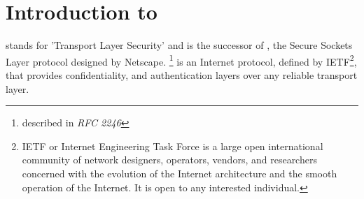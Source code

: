\chapter{Introduction to \tls{}}

\label{sec:tlsintro}
\tls{} stands for 'Transport Layer Security' and is the successor of \ssl{}, 
the Secure Sockets Layer protocol designed by Netscape. 
\tlsI{}\footnote{described in {\it RFC 2246}} is an Internet protocol,
defined by {IETF}\footnote{IETF or Internet Engineering Task Force 
is a large open international community of network
designers, operators, vendors, and researchers concerned with the evolution of 
the Internet architecture and the smooth operation of the Internet. It is open 
to any interested individual.}, 
that provides confidentiality, and authentication layers over any reliable
transport layer.












